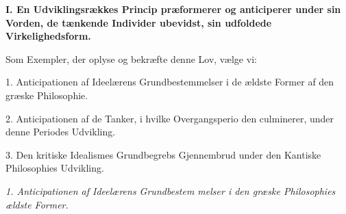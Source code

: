 \begin{center}
\textbf{\large I. En Udviklingsrækkes Princip præformerer og
anticiperer under sin Vorden, de tænkende Individer
ubevidst, sin udfoldede Virkelighedsform.}
\end{center}

Som Exempler, der oplyse og bekræfte denne Lov, vælge vi:

1. Anticipationen af Ideelærens Grundbestemmelser i de
ældste Former af den græske Philosophie.

2. Anticipationen af de Tanker, i hvilke Overgangsperio\-%
den culminerer, under denne Periodes Udvikling.

3. Den kritiske Idealismes Grundbegrebs Gjennembrud
under den Kantiske Philosophies Udvikling.

\divrule

\emph{1. Anticipationen af Ideelærens Grundbestem\-%
melser i den græske Philosophies ældste Former.}

